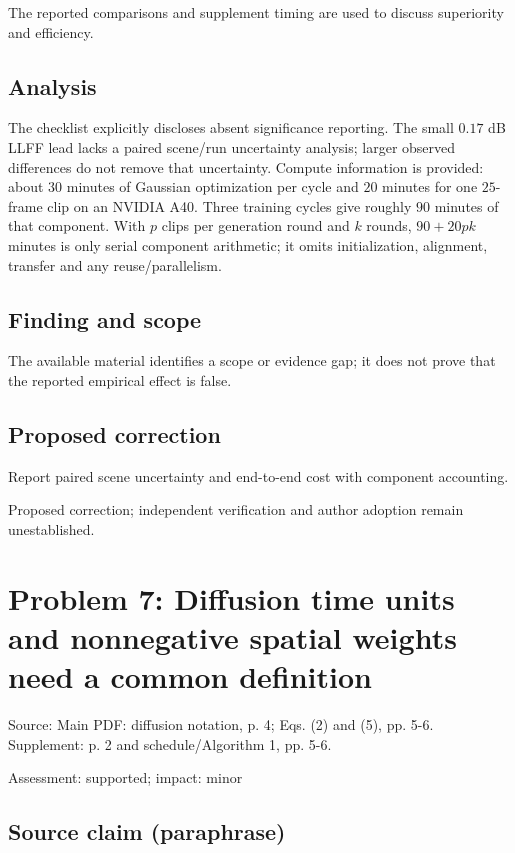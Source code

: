 \documentclass[11pt]{article}
\begin{document}
The reported comparisons and supplement timing are used to discuss superiority and efficiency.

\subsection*{Analysis}

The checklist explicitly discloses absent significance reporting. The small \(0.17\) dB LLFF lead lacks a paired scene/run uncertainty analysis; larger observed differences do not remove that uncertainty. Compute information is provided: about \(30\) minutes of Gaussian optimization per cycle and \(20\) minutes for one \(25\)-frame clip on an NVIDIA A40. Three training cycles give roughly \(90\) minutes of that component. With \(p\) clips per generation round and \(k\) rounds, \(90+20pk\) minutes is only serial component arithmetic; it omits initialization, alignment, transfer and any reuse/parallelism.

\subsection*{Finding and scope}

The available material identifies a scope or evidence gap; it does not prove that the reported empirical effect is false.

\subsection*{Proposed correction}

Report paired scene uncertainty and end-to-end cost with component accounting.

Proposed correction; independent verification and author adoption remain unestablished.

\section*{Problem 7: Diffusion time units and nonnegative spatial weights need a common definition}

Source: Main PDF: diffusion notation, p. 4; Eqs. (2) and (5), pp. 5-6. Supplement: p. 2 and schedule/Algorithm 1, pp. 5-6.

Assessment: supported; impact: minor

\subsection*{Source claim (paraphrase)}
\end{document}
